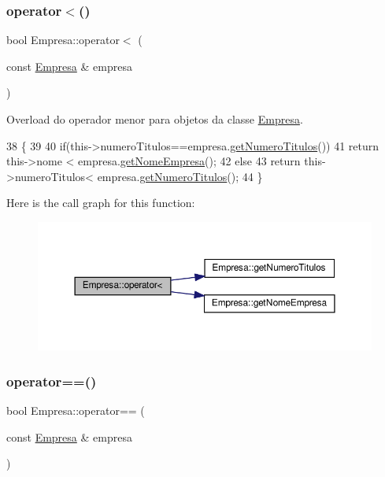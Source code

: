 \subsubsection{\texorpdfstring{operator$<$()}{operator<()}}
{\footnotesize\ttfamily bool Empresa\+::operator$<$ (\begin{DoxyParamCaption}\item[{const \hyperlink{classEmpresa}{Empresa} \&}]{empresa }\end{DoxyParamCaption})}



Overload do operador menor para objetos da classe \hyperlink{classEmpresa}{Empresa}. 


\begin{DoxyCode}
38                                                 \{
39 
40     \textcolor{keywordflow}{if}(this->numeroTitulos==empresa.\hyperlink{classEmpresa_a49b2b94a54bbc341822f64fc194f98fd}{getNumeroTitulos}())
41         \textcolor{keywordflow}{return} this->nome < empresa.\hyperlink{classEmpresa_a99bc2de98a0c0348abb74c93e6e7159e}{getNomeEmpresa}();
42      \textcolor{keywordflow}{else}
43          \textcolor{keywordflow}{return} this->numeroTitulos< empresa.\hyperlink{classEmpresa_a49b2b94a54bbc341822f64fc194f98fd}{getNumeroTitulos}();
44 \}
\end{DoxyCode}
Here is the call graph for this function\+:
\nopagebreak
\begin{figure}[H]
\begin{center}
\leavevmode
\includegraphics[width=350pt]{classEmpresa_ab643d752365e59fa1d90a41b8a036d6a_cgraph}
\end{center}
\end{figure}
\mbox{\label{classEmpresa_ad915fb38bc6c73c02fe70c62db1c9f03}} 
\subsubsection{\texorpdfstring{operator==()}{operator==()}}
{\footnotesize\ttfamily bool Empresa\+::operator== (\begin{DoxyParamCaption}\item[{const \hyperlink{classEmpresa}{Empresa} \&}]{empresa }\end{DoxyParamCaption})}



